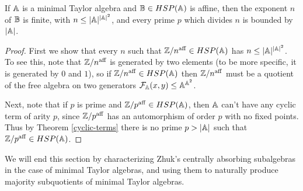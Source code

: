 \documentclass[letterpaper,11pt]{article}
\DeclareMathOperator{\aff}{aff}
\begin{document}
\begin{prop} If $\mathbb{A}$ is a minimal Taylor algebra and $\mathbb{B} \in HSP(\mathbb{A})$ is affine, then the exponent $n$ of $\mathbb{B}$ is finite, with $n \le |\mathbb{A}|^{|\mathbb{A}|^2}$, and every prime $p$ which divides $n$ is bounded by $|\mathbb{A}|$.
\end{prop}
\begin{proof} First we show that every $n$ such that $\ZZ/n^{\aff} \in HSP(\bA)$ has $n \le |\mathbb{A}|^{|\mathbb{A}|^2}$. To see this, note that $\ZZ/n^{\aff}$ is generated by two elements (to be more specific, it is generated by $0$ and $1$), so if $\ZZ/n^{\aff} \in HSP(\bA)$ then $\ZZ/n^{\aff}$ must be a quotient of the free algebra on two generators $\mathcal{F}_{\mathbb{A}}(x,y) \le \mathbb{A}^{\mathbb{A}^2}$.

Next, note that if $p$ is prime and $\ZZ/p^{\aff} \in HSP(\bA)$, then $\mathbb{A}$ can't have any cyclic term of arity $p$, since $\ZZ/p^{\aff}$ has an automorphism of order $p$ with no fixed points. Thus by Theorem \ref{cyclic-terms} there is no prime $p > |\mathbb{A}|$ such that $\ZZ/p^{\aff} \in HSP(\bA)$.
\end{proof}

We will end this section by characterizing Zhuk's centrally absorbing subalgebras in the case of minimal Taylor algebras, and using them to naturally produce majority subquotients of minimal Taylor algebras.
\end{document}
